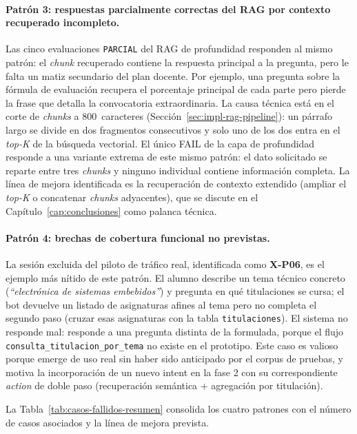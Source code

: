 \paragraph{Patrón 3: respuestas parcialmente correctas del RAG por contexto recuperado incompleto.} Las cinco evaluaciones \texttt{PARCIAL} del RAG de profundidad responden al mismo patrón: el \textit{chunk} recuperado contiene la respuesta principal a la pregunta, pero le falta un matiz secundario del plan docente. Por ejemplo, una pregunta sobre la fórmula de evaluación recupera el porcentaje principal de cada parte pero pierde la frase que detalla la convocatoria extraordinaria. La causa técnica está en el corte de \textit{chunks} a 800~caracteres (Sección~\ref{sec:impl-rag-pipeline}): un párrafo largo se divide en dos fragmentos consecutivos y solo uno de los dos entra en el \textit{top-K} de la búsqueda vectorial. El único FAIL de la capa de profundidad responde a una variante extrema de este mismo patrón: el dato solicitado se reparte entre tres \textit{chunks} y ninguno individual contiene información completa. La línea de mejora identificada es la recuperación de contexto extendido (ampliar el \textit{top-K} o concatenar \textit{chunks} adyacentes), que se discute en el Capítulo~\ref{cap:conclusiones} como palanca técnica.

\paragraph{Patrón 4: brechas de cobertura funcional no previstas.} La sesión excluida del piloto de tráfico real, identificada como \textbf{X-P06}, es el ejemplo más nítido de este patrón. El alumno describe un tema técnico concreto (\textit{``electrónica de sistemas embebidos''}) y pregunta en qué titulaciones se cursa; el bot devuelve un listado de asignaturas afines al tema pero no completa el segundo paso (cruzar esas asignaturas con la tabla \texttt{titulaciones}). El sistema no responde mal: responde a una pregunta distinta de la formulada, porque el flujo \texttt{consulta\_titulacion\_por\_tema} no existe en el prototipo. Este caso es valioso porque emerge de uso real sin haber sido anticipado por el corpus de pruebas, y motiva la incorporación de un nuevo intent en la fase 2 con su correspondiente \textit{action} de doble paso (recuperación semántica + agregación por titulación).

\medskip

La Tabla~\ref{tab:casos-fallidos-resumen} consolida los cuatro patrones con el número de casos asociados y la línea de mejora prevista.

